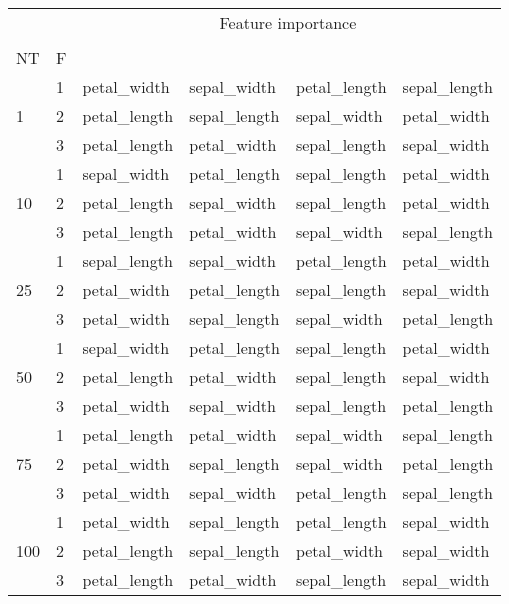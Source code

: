 \begin{table}[htbp]
\centering
\label{iris-features}
\begin{tabular}{llllll}
\toprule
 &  & \multicolumn{4}{c}{Feature importance} \\
 &  & #1 & #2 & #3 & #4 \\
NT & F &  &  &  &  \\
\midrule
\multirow[c]{3}{*}{1} & 1 & petal_width & sepal_width & petal_length & sepal_length \\
 & 2 & petal_length & sepal_length & sepal_width & petal_width \\
 & 3 & petal_length & petal_width & sepal_length & sepal_width \\
\multirow[c]{3}{*}{10} & 1 & sepal_width & petal_length & sepal_length & petal_width \\
 & 2 & petal_length & sepal_width & sepal_length & petal_width \\
 & 3 & petal_length & petal_width & sepal_width & sepal_length \\
\multirow[c]{3}{*}{25} & 1 & sepal_length & sepal_width & petal_length & petal_width \\
 & 2 & petal_width & petal_length & sepal_length & sepal_width \\
 & 3 & petal_width & sepal_length & sepal_width & petal_length \\
\multirow[c]{3}{*}{50} & 1 & sepal_width & petal_length & sepal_length & petal_width \\
 & 2 & petal_length & petal_width & sepal_length & sepal_width \\
 & 3 & petal_width & sepal_width & sepal_length & petal_length \\
\multirow[c]{3}{*}{75} & 1 & petal_length & petal_width & sepal_width & sepal_length \\
 & 2 & petal_width & sepal_length & sepal_width & petal_length \\
 & 3 & petal_width & sepal_width & petal_length & sepal_length \\
\multirow[c]{3}{*}{100} & 1 & petal_width & sepal_length & petal_length & sepal_width \\
 & 2 & petal_length & sepal_length & petal_width & sepal_width \\
 & 3 & petal_length & petal_width & sepal_length & sepal_width \\
\bottomrule
\end{tabular}
\end{table}
